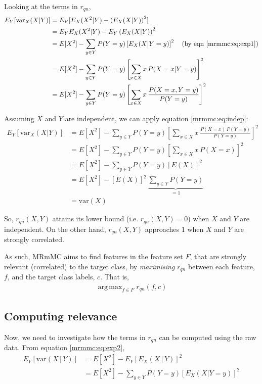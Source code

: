 \documentclass[12pt, twoside, a4paper]{report}
\def\var{\text{var}}
\DeclareMathOperator*{\argmax}{arg\,max}
\begin{document}
Looking at the terms in $r_{qn}$,
\begin{align*}
E_Y[\var_X(X|Y)]
&= E_Y [E_X(X^2|Y)-\left( E_X(X|Y) \right)^2 ] \\
&= E_YE_X(X^2|Y) - E_Y\left( E_X(X|Y) \right)^2 \\
&= E[X^2] - \sum_{y\in Y} P(Y=y) \left[ E_X(X|Y=y) \right]^2 \quad \text{(by eqn \ref{mrmmc:eq:exp1})} \\
&= E[X^2] - \sum_{y\in Y} P(Y=y) \left[ \sum_{x \in X} x \, P(X=x|Y=y) \right]^2 \\
&= E[X^2] - \sum_{y\in Y} P(Y=y) \left[ \sum_{x \in X} x \, \frac{P(X=x, Y=y)}{P(Y=y)} \right]^2
\end{align*}

Assuming $X$ and $Y$ are independent, we can apply equation \ref{mrmmc:eq:indep}:
\begin{align*}
E_Y[\var_X(X|Y)]
&= E[X^2] - \sum_{y\in Y} P(Y=y) \left[ \sum_{x \in X} x \, \frac{P(X=x) \, P(Y=y)}{P(Y=y)} \right]^2 \\
&= E[X^2] - \sum_{y\in Y} P(Y=y) \left[ \sum_{x \in X} x \, P(X=x) \right]^2 \\
&= E[X^2] - \sum_{y\in Y} P(Y=y) \left[ E(X) \right]^2 \\
&= E[X^2] - \left[ E(X) \right]^2 \, \underbrace{\sum_{y\in Y} P(Y=y)}_{=1} \\
&= \var(X)
\end{align*}

So, $r_{qn}(X, Y)$ attains its lower bound (i.e. $r_{qn}(X, Y)=0$) when $X$ and $Y$ are independent. On the other hand, $r_{qn}(X, Y)$ approaches 1 when $X$ and $Y$ are strongly correlated.

As such, MRmMC aims to find features in the feature set $F$, that are strongly relevant (correlated) to the target class, by \textit{maximising} $r_{qn}$ between each feature, $f$, and the target class labels, $c$. That is,
\begin{align*}
\argmax_{f \in F} r_{qn}(f, c)
\end{align*}

\subsection{Computing relevance}
Now, we need to investigate how the terms in $r_{qn}$ can be computed using the raw data. From equation \ref{mrmmc:eq:exp2},
\begin{align*}
E_Y [ \var(X \, | \, Y) ]
&= E[X^2] - E_Y [ E_X(X\,|\,Y) ] ^2 \\
&= E[X^2] - \sum_{y \in Y} P(Y=y) \left[ E_X(X|Y=y) \right]^2 
\end{align*}
\end{document}
